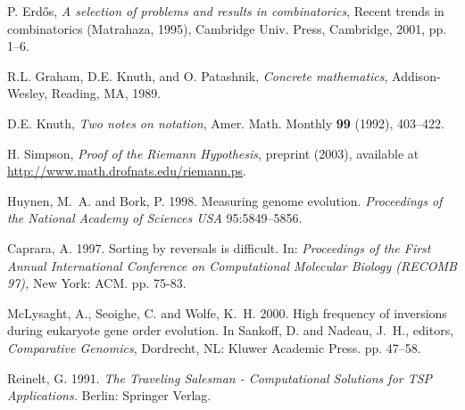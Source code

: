 \documentclass[12pt]{article}   %
\begin{document}
\newpage %

\begin{thebibliography}{99} %


 P. Erd\H os, \emph{A selection of problems and
results in combinatorics}, Recent trends in combinatorics (Matrahaza,
1995), Cambridge Univ. Press, Cambridge, 2001, pp. 1--6.

R.L. Graham, D.E. Knuth, and O. Patashnik, \emph{Concrete
mathematics}, Addison-Wesley, Reading, MA, 1989.

 D.E. Knuth, \emph{Two notes on notation}, Amer.
Math. Monthly \textbf{99} (1992), 403--422.

 H. Simpson, \emph{Proof of the Riemann
Hypothesis},  preprint (2003), available at 
\url{http://www.math.drofnats.edu/riemann.ps}.

 Huynen, M.~A. and Bork, P. 1998. Measuring genome evolution. {\em
Proceedings of the National Academy of Sciences USA}
  95:5849--5856.

 Caprara, A. 1997. Sorting by reversals is difficult. In: {\em
Proceedings of the First Annual International Conference on Computational
Molecular Biology (RECOMB 97),} New York: ACM.  pp. 75-83.

McLysaght, A., Seoighe, C. and Wolfe, K.~H. 2000. High frequency
of inversions during eukaryote gene order evolution.     In Sankoff, D. and
Nadeau, J.~H., editors, {\em Comparative Genomics},  Dordrecht, NL: Kluwer
Academic Press. pp. 47--58.

 Reinelt, G. 1991. {\em The Traveling Salesman - Computational
Solutions for TSP Applications.} Berlin: Springer Verlag.

\end{thebibliography}
\end{document}
